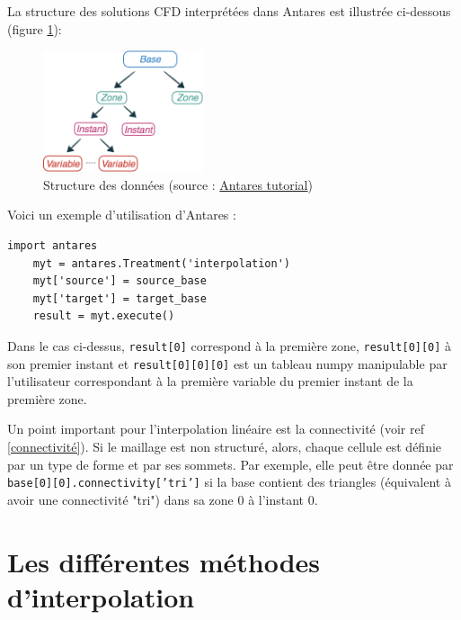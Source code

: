
La structure des solutions CFD interprétées dans Antares est illustrée ci-dessous (figure \ref{fig:structure_antares}):

\begin{figure}[H]
\centering
\includegraphics[width=0.42\textwidth]{images/data_structure_1.png}
\caption{Structure des données (source : \href{https://cerfacs.fr/antares/src/tutorial/base.html}{Antares tutorial})}
\label{fig:structure_antares}
\end{figure}

Voici un exemple d'utilisation d'Antares :

\begin{lstlisting}[caption=Exemple simple d'utilisation d'Antares pour interpoler, label={lst:antares_2}]
    import antares
    myt = antares.Treatment('interpolation')
    myt['source'] = source_base
    myt['target'] = target_base
    result = myt.execute()
\end{lstlisting}

Dans le cas ci-dessus, \texttt{result[0]} correspond à la première zone, \texttt{result[0][0]} à son premier instant et \texttt{result[0][0][0]} est un tableau numpy manipulable par l'utilisateur correspondant à la première variable du premier instant de la première zone.

Un point important pour l'interpolation linéaire est la connectivité (voir ref \ref{connectivité}). Si le maillage est non structuré, alors, chaque cellule est définie par un type de forme et par ses sommets. Par exemple, elle peut être donnée par \texttt{base[0][0].connectivity['tri']} si la base contient des triangles (équivalent à avoir une connectivité "tri") dans sa zone 0 à l'instant 0.


\newpage
\section{Les différentes méthodes d'interpolation}

